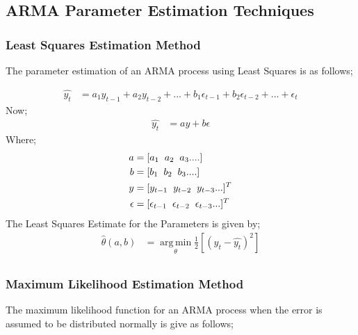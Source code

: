 \documentclass[journal]{IEEEtran}
\begin{document}
\subsection{ARMA Parameter Estimation Techniques}



\subsubsection{Least Squares Estimation Method}

The parameter estimation of an ARMA process using Least Squares is as follows;

\begin{align*}
\widehat{y_{t}} &= a_{1}y_{t-1} + a_{2}y_{t-2} + ... + b_{1}\epsilon_{t-1} + b_{2}\epsilon_{t-2}+ ... + \epsilon_{t}
\end{align*}
Now;
\begin{align*}
\widehat{y_{t}} &= ay + b\epsilon
\end{align*}
Where;
\begin{align*}
a &= [a_{1} \hspace{2mm} a_{2} \hspace{2mm} a_{3} .... ]\\
b &= [b_{1} \hspace{2mm} b_{2} \hspace{2mm} b_{3} .... ]\\
y &= [y_{t-1} \hspace{2mm} y_{t-2} \hspace{2mm} y_{t-3} ...]^{T}\\
\epsilon &= [\epsilon_{t-1} \hspace{2mm} \epsilon_{t-2} \hspace{2mm} \epsilon_{t-3} ...]^{T}
\end{align*}
The Least Squares Estimate for the Parameters is given by;
\begin{align*}
\widehat{\theta}(a,b) &= \operatorname*{arg\,min}_\theta \frac{1}{2} \left[ \left(y_{t}-\widehat{y_{t}} \right)^{2} \right]\\
\end{align*}

\subsubsection{Maximum Likelihood Estimation Method}

The maximum likelihood function for an ARMA process when the error is assumed to be distributed normally is give as follows;
\end{document}
